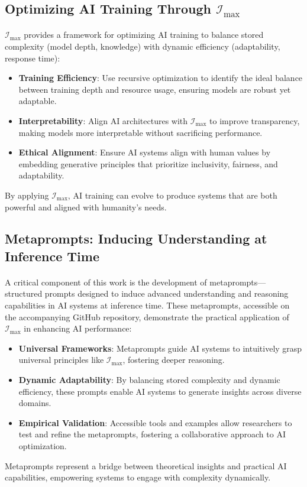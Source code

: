 \documentclass[12pt]{article}
\begin{document}
\subsection{Optimizing AI Training Through \(\mathcal{I}_{\text{max}}\)}
\paragraph{}
\(\mathcal{I}_{\text{max}}\) provides a framework for optimizing AI training to balance stored complexity (model depth, knowledge) with dynamic efficiency (adaptability, response time):
\begin{itemize}
    \item \textbf{Training Efficiency}: Use recursive optimization to identify the ideal balance between training depth and resource usage, ensuring models are robust yet adaptable.
    \item \textbf{Interpretability}: Align AI architectures with \(\mathcal{I}_{\text{max}}\) to improve transparency, making models more interpretable without sacrificing performance.
    \item \textbf{Ethical Alignment}: Ensure AI systems align with human values by embedding generative principles that prioritize inclusivity, fairness, and adaptability.
\end{itemize}
By applying \(\mathcal{I}_{\text{max}}\), AI training can evolve to produce systems that are both powerful and aligned with humanity’s needs.

\subsection{Metaprompts: Inducing Understanding at Inference Time}
\paragraph{}
A critical component of this work is the development of metaprompts—structured prompts designed to induce advanced understanding and reasoning capabilities in AI systems at inference time. These metaprompts, accessible on the accompanying GitHub repository, demonstrate the practical application of \(\mathcal{I}_{\text{max}}\) in enhancing AI performance:
\begin{itemize}
    \item \textbf{Universal Frameworks}: Metaprompts guide AI systems to intuitively grasp universal principles like \(\mathcal{I}_{\text{max}}\), fostering deeper reasoning.
    \item \textbf{Dynamic Adaptability}: By balancing stored complexity and dynamic efficiency, these prompts enable AI systems to generate insights across diverse domains.
    \item \textbf{Empirical Validation}: Accessible tools and examples allow researchers to test and refine the metaprompts, fostering a collaborative approach to AI optimization.
\end{itemize}
Metaprompts represent a bridge between theoretical insights and practical AI capabilities, empowering systems to engage with complexity dynamically.
\end{document}

